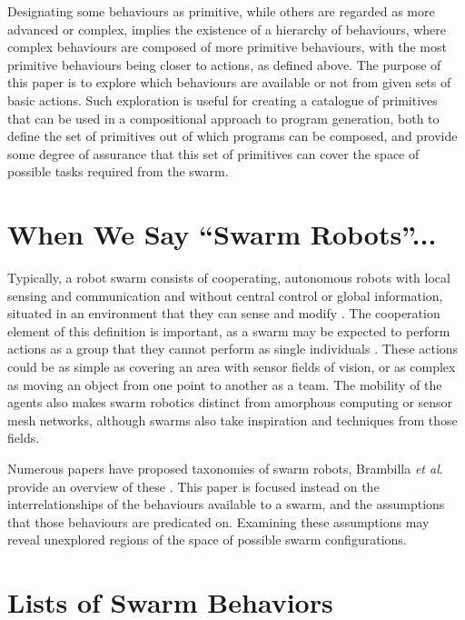 \documentclass[]{article}
\begin{document}
Designating some behaviours as primitive, while others are regarded as more advanced or complex, implies the existence of a hierarchy of behaviours, where complex behaviours are composed of more primitive behaviours, with the most primitive behaviours being closer to actions, as defined above. 
The purpose of this paper is to explore which behaviours are available or not from given sets of basic actions.
Such exploration is useful for creating a catalogue of primitives that can be used in a compositional approach to program generation, both to define the set of primitives out of which programs can be composed, and provide some degree of assurance that this set of primitives can cover the space of possible tasks required from the swarm. 

\section{When We Say ``Swarm Robots''...}

Typically, a robot swarm consists of cooperating, autonomous robots with local sensing and communication and without central control or global information, situated in an environment that they can sense and modify \cite{brambilla2013swarm}.
The cooperation element of this definition is important, as a swarm may be expected to perform actions as a group that they cannot perform as single individuals \cite{csahin2004swarm}. 
These actions could be as simple as covering an area with sensor fields of vision, or as complex as moving an object from one point to another as a team. 
The mobility of the agents also makes swarm robotics distinct from amorphous computing or sensor mesh networks, although swarms also take inspiration and techniques from those fields.  

Numerous papers have proposed taxonomies of swarm robots, Brambilla \textit{et al}. provide an overview of these \cite{brambilla2013swarm}. 
This paper is focused instead on the interrelationships of the behaviours available to a swarm, and the assumptions that those behaviours are predicated on. 
Examining these assumptions may reveal unexplored regions of the space of possible swarm configurations. 


\section{Lists of Swarm Behaviors}
\end{document}
